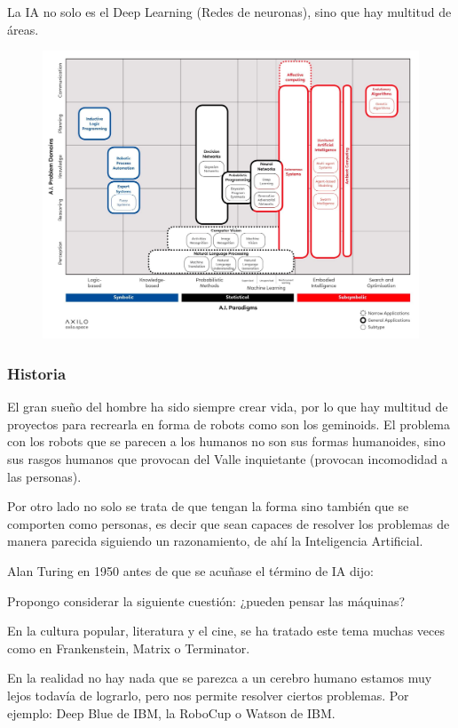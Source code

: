 \documentclass[12pt, twoside, openright]{report} %
\begin{document}
La IA no solo es el Deep Learning (Redes de neuronas), sino que hay multitud de áreas.
\begin{figure}[H]
	{\includegraphics[scale=.23]{areas-ia.jpg}}
\end{figure}

\subsubsection{Historia}
El gran sueño del hombre ha sido siempre crear vida, por lo que hay multitud de proyectos para recrearla en forma de robots como son los geminoids. El problema con los robots que se parecen a los humanos no son sus formas humanoides, sino sus rasgos humanos que provocan del Valle inquietante (provocan incomodidad a las personas).

Por otro lado no solo se trata de que tengan la forma sino también que se comporten como personas, es decir que sean capaces de resolver los problemas de manera parecida siguiendo un razonamiento, de ahí la Inteligencia Artificial.

Alan Turing en 1950 antes de que se acuñase el término de IA dijo:
\begin{displayquote}
	Propongo considerar la siguiente cuestión: ¿pueden pensar las máquinas?
\end{displayquote}

En la cultura popular, literatura y el cine, se ha tratado este tema muchas veces como en Frankenstein, Matrix o Terminator.

En la realidad no hay nada que se parezca a un cerebro humano estamos muy lejos todavía de lograrlo, pero nos permite resolver ciertos problemas. Por ejemplo: Deep Blue de IBM, la RoboCup o Watson de IBM.
\end{document}
